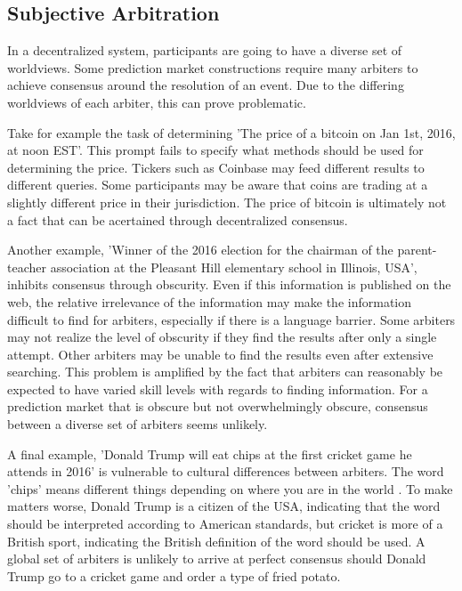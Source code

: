 \documentclass[onecolumn]{article}
\begin{document}
\begin{appendices}

\section{Subjective Arbitration}
In a decentralized system, participants are going to have a diverse set of worldviews.
Some prediction market constructions require many arbiters to achieve consensus around the resolution of an event.
Due to the differing worldviews of each arbiter, this can prove problematic.

Take for example the task of determining 'The price of a bitcoin on Jan 1st, 2016, at noon EST'.
This prompt fails to specify what methods should be used for determining the price.
Tickers such as Coinbase may feed different results to different queries.
Some participants may be aware that coins are trading at a slightly different price in their jurisdiction.
The price of bitcoin is ultimately not a fact that can be acertained through decentralized consensus.

Another example, 'Winner of the 2016 election for the chairman of the parent-teacher association at the Pleasant Hill elementary school in Illinois, USA', inhibits consensus through obscurity.
Even if this information is published on the web, the relative irrelevance of the information may make the information difficult to find for arbiters, especially if there is a language barrier.
Some arbiters may not realize the level of obscurity if they find the results after only a single attempt.
Other arbiters may be unable to find the results even after extensive searching.
This problem is amplified by the fact that arbiters can reasonably be expected to have varied skill levels with regards to finding information.
For a prediction market that is obscure but not overwhelmingly obscure, consensus between a diverse set of arbiters seems unlikely.

A final example, 'Donald Trump will eat chips at the first cricket game he attends in 2016' is vulnerable to cultural differences between arbiters.
The word 'chips' means different things depending on where you are in the world \cite{chips}.
To make matters worse, Donald Trump is a citizen of the USA, indicating that the word should be interpreted according to American standards,
but cricket is more of a British sport, indicating the British definition of the word should be used.
A global set of arbiters is unlikely to arrive at perfect consensus should Donald Trump go to a cricket game and order a type of fried potato.


\end{appendices}
\end{document}

